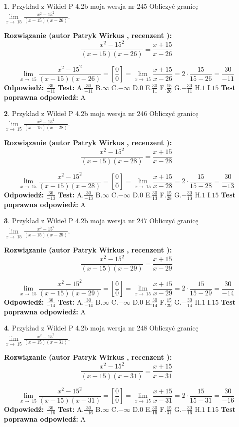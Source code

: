 \documentclass[12pt, a4paper]{article}
\theoremstyle{definition} %
\newtheorem{zad}{}
\newcommand{\zadStart}[1]{\begin{zad}#1\newline}
\newcommand{\zadStop}{\end{zad}}
\newcommand{\rozwStart}[2]{\noindent \textbf{Rozwiązanie (autor #1 , recenzent #2): }\newline}
\newcommand{\rozwStop}{\newline}
\newcommand{\odpStart}{\noindent \textbf{Odpowiedź:}\newline}
\newcommand{\odpStop}{\newline}
\newcommand{\testStart}{\noindent \textbf{Test:}\newline}
\newcommand{\testStop}{\newline}
\newcommand{\kluczStart}{\noindent \textbf{Test poprawna odpowiedź:}\newline}
\newcommand{\kluczStop}{\newline}
\begin{document}
\zadStart{Przykład z Wikieł P 4.2b moja wersja nr 245}
Obliczyć granicę $\lim\limits_{x\to\ 15}\frac{x^{2}-15^{2}}{(x-15)(x-26)}$.
\zadStop
\rozwStart{Patryk Wirkus}{}
$$\frac{x^{2}-15^{2}}{(x-15)(x-26)}=\frac{x+15}{x-26}$$

$$\lim\limits_{x\to\ 15}\frac{x^{2}-15^{2}}{(x-15)(x-26)}=[\frac{0}{0}]=\lim\limits_{x\to\ 15}\frac{x+15}{x-26}=2 \cdot \frac{15}{15-26} = \frac{30}{-11}$$
\rozwStop
\odpStart
$\frac{30}{-11}$
\odpStop
\testStart
A.$\frac{30}{-11}$
B.$\infty$
C.$-\infty$
D.$0$
E.$\frac{30}{11}$
F.$\frac{15}{26}$
G.$-\frac{30}{11}$
H.$1$
I.$15$
\testStop
\kluczStart
A
\kluczStop



\zadStart{Przykład z Wikieł P 4.2b moja wersja nr 246}
Obliczyć granicę $\lim\limits_{x\to\ 15}\frac{x^{2}-15^{2}}{(x-15)(x-28)}$.
\zadStop
\rozwStart{Patryk Wirkus}{}
$$\frac{x^{2}-15^{2}}{(x-15)(x-28)}=\frac{x+15}{x-28}$$

$$\lim\limits_{x\to\ 15}\frac{x^{2}-15^{2}}{(x-15)(x-28)}=[\frac{0}{0}]=\lim\limits_{x\to\ 15}\frac{x+15}{x-28}=2 \cdot \frac{15}{15-28} = \frac{30}{-13}$$
\rozwStop
\odpStart
$\frac{30}{-13}$
\odpStop
\testStart
A.$\frac{30}{-13}$
B.$\infty$
C.$-\infty$
D.$0$
E.$\frac{30}{13}$
F.$\frac{15}{28}$
G.$-\frac{30}{13}$
H.$1$
I.$15$
\testStop
\kluczStart
A
\kluczStop



\zadStart{Przykład z Wikieł P 4.2b moja wersja nr 247}
Obliczyć granicę $\lim\limits_{x\to\ 15}\frac{x^{2}-15^{2}}{(x-15)(x-29)}$.
\zadStop
\rozwStart{Patryk Wirkus}{}
$$\frac{x^{2}-15^{2}}{(x-15)(x-29)}=\frac{x+15}{x-29}$$

$$\lim\limits_{x\to\ 15}\frac{x^{2}-15^{2}}{(x-15)(x-29)}=[\frac{0}{0}]=\lim\limits_{x\to\ 15}\frac{x+15}{x-29}=2 \cdot \frac{15}{15-29} = \frac{30}{-14}$$
\rozwStop
\odpStart
$\frac{30}{-14}$
\odpStop
\testStart
A.$\frac{30}{-14}$
B.$\infty$
C.$-\infty$
D.$0$
E.$\frac{30}{14}$
F.$\frac{15}{29}$
G.$-\frac{30}{14}$
H.$1$
I.$15$
\testStop
\kluczStart
A
\kluczStop



\zadStart{Przykład z Wikieł P 4.2b moja wersja nr 248}
Obliczyć granicę $\lim\limits_{x\to\ 15}\frac{x^{2}-15^{2}}{(x-15)(x-31)}$.
\zadStop
\rozwStart{Patryk Wirkus}{}
$$\frac{x^{2}-15^{2}}{(x-15)(x-31)}=\frac{x+15}{x-31}$$

$$\lim\limits_{x\to\ 15}\frac{x^{2}-15^{2}}{(x-15)(x-31)}=[\frac{0}{0}]=\lim\limits_{x\to\ 15}\frac{x+15}{x-31}=2 \cdot \frac{15}{15-31} = \frac{30}{-16}$$
\rozwStop
\odpStart
$\frac{30}{-16}$
\odpStop
\testStart
A.$\frac{30}{-16}$
B.$\infty$
C.$-\infty$
D.$0$
E.$\frac{30}{16}$
F.$\frac{15}{31}$
G.$-\frac{30}{16}$
H.$1$
I.$15$
\testStop
\kluczStart
A
\kluczStop
\end{document}
